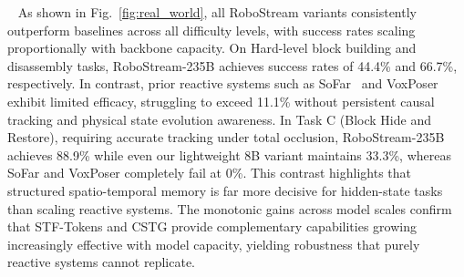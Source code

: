 ~
As shown in Fig.~\ref{fig:real_world}, all RoboStream variants consistently outperform baselines across all difficulty levels, with success rates scaling proportionally with backbone capacity. On Hard-level block building and disassembly tasks, RoboStream-235B achieves success rates of 44.4\% and 66.7\%, respectively. In contrast, prior reactive systems such as SoFar~\cite{qisofar} and VoxPoser~\cite{huang2023voxposer} exhibit limited efficacy, struggling to exceed 11.1\% without persistent causal tracking and physical state evolution awareness. In Task C (Block Hide and Restore), requiring accurate tracking under total occlusion, RoboStream-235B achieves 88.9\% while even our lightweight 8B variant maintains 33.3\%, whereas SoFar and VoxPoser completely fail at 0\%. This contrast highlights that structured spatio-temporal memory is far more decisive for hidden-state tasks than scaling reactive systems. The monotonic gains across model scales confirm that STF-Tokens and CSTG provide complementary capabilities growing increasingly effective with model capacity, yielding robustness that purely reactive systems cannot replicate.

